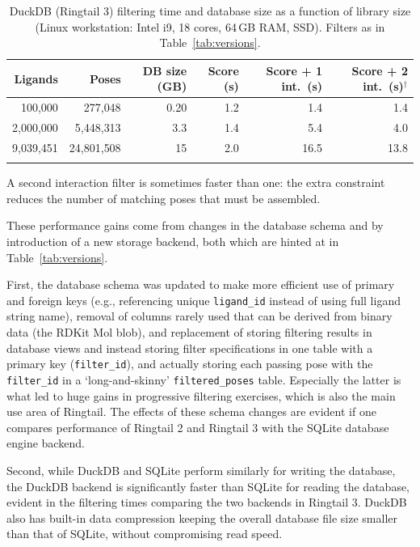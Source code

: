 \documentclass[unnumsec,webpdf,contemporary,large]{oup-authoring-template}
\begin{document}
\begin{table}[t]
\caption{DuckDB (Ringtail 3) filtering time and database size as a function of library size (Linux workstation: Intel i9, 18 cores, 64\,GB RAM, SSD). Filters as in Table~\ref{tab:versions}.}
\label{tab:scaling}
\centering
\begin{tabular}{@{}rrrrrr@{}}
\toprule
Ligands & Poses & DB size (GB) & Score (s) & Score + 1 int.\ (s) & Score + 2 int.\ (s)$^{\dagger}$ \\
\midrule
100{,}000    & 277{,}048     & 0.20 & 1.2 & 1.4  & 1.4  \\
2{,}000{,}000  & 5{,}448{,}313   & 3.3  & 1.4 & 5.4  & 4.0  \\
9{,}039{,}451  & 24{,}801{,}508  & 15   & 2.0 & 16.5 & 13.8 \\
\botrule
\end{tabular}
\begin{tablenotes}
\item[$\dagger$] A second interaction filter is sometimes faster than one: the extra constraint reduces the number of matching poses that must be assembled.
\end{tablenotes}
\end{table}

These performance gains come from changes in the database schema and by introduction of a new storage backend, both which are hinted at in Table~\ref{tab:versions}. 

First, the database schema was updated to make more efficient use of primary and foreign keys (e.g., referencing unique \texttt{ligand\_id} instead of using full ligand string name), removal of columns rarely used that can be derived from binary data (the RDKit Mol blob), and replacement of storing filtering results in database views and instead storing filter specifications in one table with a primary key (\texttt{filter\_id}), and actually storing each passing pose with the \texttt{filter\_id} in a `long-and-skinny' \texttt{filtered\_poses} table. Especially the latter is what led to huge gains in progressive filtering exercises, which is also the main use area of Ringtail. The effects of these schema changes are evident if one compares performance of Ringtail 2 and Ringtail 3 with the SQLite database engine backend.

Second, while DuckDB and SQLite perform similarly for writing the database, the DuckDB backend is significantly faster than SQLite for reading the database, evident in the filtering times comparing the two backends in Ringtail 3. DuckDB also has built-in data compression \citep{Raasveldt2022} keeping the overall database file size smaller than that of SQLite, without compromising read speed.
\end{document}
